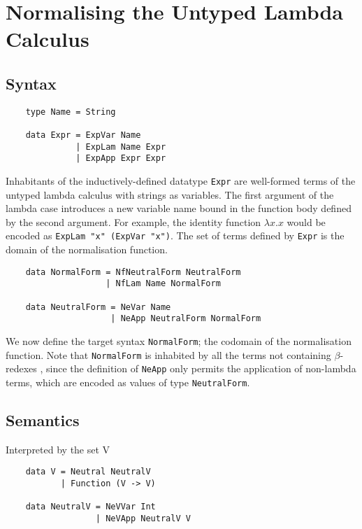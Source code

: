 \chapter{Normalising the Untyped Lambda Calculus}
\label{chap:untypednbe}

\section{Syntax}

\begin{lstlisting}
    type Name = String

    data Expr = ExpVar Name
              | ExpLam Name Expr
              | ExpApp Expr Expr
\end{lstlisting}

Inhabitants of the inductively-defined datatype \lstinline{Expr} are well-formed terms of the untyped lambda calculus with strings as variables. The first argument of the lambda case introduces a new variable name bound in the function body defined by the second argument. For example, the identity function $\lambda x . x$ would be encoded as \lstinline{ExpLam "x" (ExpVar "x")}. The set of terms defined by \lstinline{Expr} is the domain of the normalisation function.

\begin{lstlisting}
    data NormalForm = NfNeutralForm NeutralForm
                    | NfLam Name NormalForm

    data NeutralForm = NeVar Name
                     | NeApp NeutralForm NormalForm
\end{lstlisting}

We now define the target syntax \lstinline{NormalForm}; the codomain of the normalisation function. Note that \lstinline{NormalForm} is inhabited by all the terms not containing $\beta$-redexes \cite{slides}, since the definition of \lstinline{NeApp} only permits the application of non-lambda terms, which are encoded as values of type \lstinline{NeutralForm}.


\section{Semantics}
Interpreted by the set V \cite{slides}
\begin{lstlisting}
    data V = Neutral NeutralV
           | Function (V -> V)

    data NeutralV = NeVVar Int
                  | NeVApp NeutralV V
\end{lstlisting}

